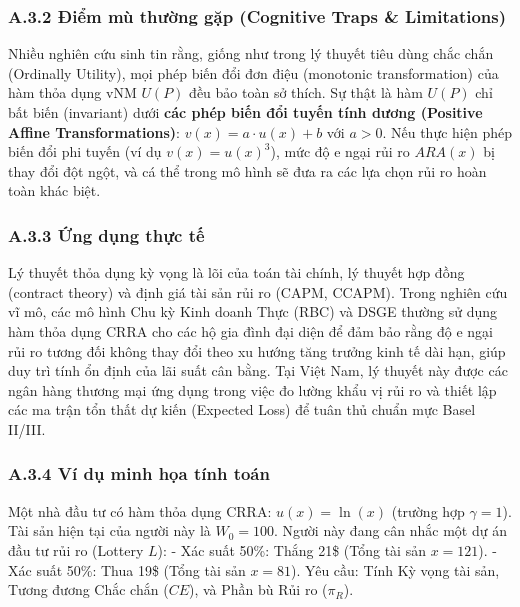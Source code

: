 \documentclass[
]{article}
\begin{document}
\subsubsection{A.3.2 Điểm mù thường gặp (Cognitive Traps \&
Limitations)}\label{a.3.2-ux111iux1ec3m-muxf9-thux1b0ux1eddng-gux1eb7p-cognitive-traps-limitations-1}

Nhiều nghiên cứu sinh tin rằng, giống như trong lý thuyết tiêu dùng chắc
chắn (Ordinally Utility), mọi phép biến đổi đơn điệu (monotonic
transformation) của hàm thỏa dụng vNM \(U(P)\) đều bảo toàn sở thích. Sự
thật là hàm \(U(P)\) chỉ bất biến (invariant) dưới \textbf{các phép biến
đổi tuyến tính dương (Positive Affine Transformations)}:
\(v(x) = a \cdot u(x) + b\) với \(a>0\). Nếu thực hiện phép biến đổi phi
tuyến (ví dụ \(v(x) = u(x)^3\)), mức độ e ngại rủi ro \(ARA(x)\) bị thay
đổi đột ngột, và cá thể trong mô hình sẽ đưa ra các lựa chọn rủi ro hoàn
toàn khác biệt.

\subsubsection{A.3.3 Ứng dụng thực
tế}\label{a.3.3-ux1ee9ng-dux1ee5ng-thux1ef1c-tux1ebf}

Lý thuyết thỏa dụng kỳ vọng là lõi của toán tài chính, lý thuyết hợp
đồng (contract theory) và định giá tài sản rủi ro (CAPM, CCAPM). Trong
nghiên cứu vĩ mô, các mô hình Chu kỳ Kinh doanh Thực (RBC) và DSGE
thường sử dụng hàm thỏa dụng CRRA cho các hộ gia đình đại diện để đảm
bảo rằng độ e ngại rủi ro tương đối không thay đổi theo xu hướng tăng
trưởng kinh tế dài hạn, giúp duy trì tính ổn định của lãi suất cân bằng.
Tại Việt Nam, lý thuyết này được các ngân hàng thương mại ứng dụng trong
việc đo lường khẩu vị rủi ro và thiết lập các ma trận tổn thất dự kiến
(Expected Loss) để tuân thủ chuẩn mực Basel II/III.

\subsubsection{A.3.4 Ví dụ minh họa tính
toán}\label{a.3.4-vuxed-dux1ee5-minh-hux1ecda-tuxednh-touxe1n}

Một nhà đầu tư có hàm thỏa dụng CRRA: \(u(x) = \ln(x)\) (trường hợp
\(\gamma = 1\)). Tài sản hiện tại của người này là \(W_0 = 100\). Người
này đang cân nhắc một dự án đầu tư rủi ro (Lottery \(L\)): - Xác suất
50\%: Thắng 21\$ (Tổng tài sản \(x = 121\)). - Xác suất 50\%: Thua 19\$
(Tổng tài sản \(x = 81\)). Yêu cầu: Tính Kỳ vọng tài sản, Tương đương
Chắc chắn (\(CE\)), và Phần bù Rủi ro (\(\pi_R\)).
\end{document}
